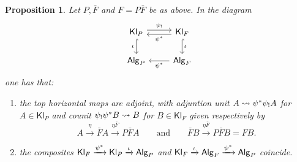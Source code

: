 \documentclass[a4paper,10pt
,draft
]{article}%
\numberwithin{equation}{section}
\numberwithin{figure}{section}
\newtheorem{proposition}[equation]{Proposition}%
\theoremstyle{definition} %
\newcommand{\Kl}{\mathsf{Kl}}
\newcommand{\1}{\ensuremath{\mathbbm 1}}%
\begin{document}
\begin{proposition}\label{PARTADJP PROP}
Let $P,\bar{F}$ and $F = P \bar{F}$ be as above.
%
%
In the diagram
\begin{equation}\label{PARTADJP EQ}
\begin{tikzcd}
	\mathsf{Kl}_{P} 
	\ar[shift left=0.25em]{r}{\psi_!} 
	\ar[hookrightarrow]{d}[swap]{\iota}
&
	\mathsf{Kl}_{F} 
	\ar[shift left=0.25em]{l}{\psi^{\**}}
	\ar[hookrightarrow]{d}{\iota}
\\
	\mathsf{Alg}_{P} &
	\mathsf{Alg}_{F}  \ar{l}{\psi^{\**}}
\end{tikzcd}
\end{equation}
one has that:
\begin{enumerate}[label=(\roman*)]
\item the top horizontal maps are adjoint,
with adjuntion unit
$A \rightsquigarrow \psi^{\**} \psi_! A$
for $A \in \Kl_P$
and counit
$\psi_! \psi^{\**} B \rightsquigarrow B$
for $B \in \Kl_F$
given respectively by 
\begin{equation}\label{UNITCOUNIT EQ}
	A \xrightarrow{\eta} 
	\bar{F} A \xrightarrow{\eta \bar{F}}
	P \bar{F} A
        \qquad
        \mbox{and}
        \qquad
	\bar{F} B \xrightarrow{\eta \bar{F}}
	P \bar{F} B =
	F B.
\end{equation}
\item the composites
$
	\mathsf{Kl}_F \xrightarrow{\psi^{\**}} 
	\mathsf{Kl}_P \xrightarrow{\iota} 
	\mathsf{Alg}_P
$
and
$
	\mathsf{Kl}_F \xrightarrow{\iota}
	\mathsf{Alg}_F  \xrightarrow{\psi^{\**}} 
	\mathsf{Alg}_P
$
coincide.
\end{enumerate}
\end{proposition}
\end{document}

